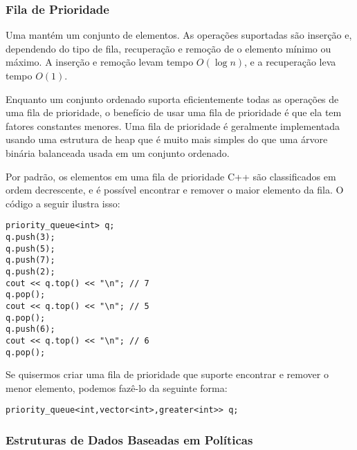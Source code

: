 \subsubsection{Fila de Prioridade}


Uma 
mantém um conjunto de elementos.
As operações suportadas são inserção e,
dependendo do tipo de fila,
recuperação e remoção de
o elemento mínimo ou máximo.
A inserção e remoção levam tempo $O(\log n)$,
e a recuperação leva tempo $O(1)$.

Enquanto um conjunto ordenado suporta eficientemente
todas as operações de uma fila de prioridade,
o benefício de usar uma fila de prioridade é
que ela tem fatores constantes menores.
Uma fila de prioridade é geralmente implementada usando
uma estrutura de heap que é muito mais simples do que uma
árvore binária balanceada usada em um conjunto ordenado.

\begin{samepage}
Por padrão, os elementos em uma
fila de prioridade C++ são classificados em ordem decrescente,
e é possível encontrar e remover o
maior elemento da fila.
O código a seguir ilustra isso:

\begin{lstlisting}
priority_queue<int> q;
q.push(3);
q.push(5);
q.push(7);
q.push(2);
cout << q.top() << "\n"; // 7
q.pop();
cout << q.top() << "\n"; // 5
q.pop();
q.push(6);
cout << q.top() << "\n"; // 6
q.pop();
\end{lstlisting}
\end{samepage}

Se quisermos criar uma fila de prioridade
que suporte encontrar e remover
o menor elemento,
podemos fazê-lo da seguinte forma:

\begin{lstlisting}
priority_queue<int,vector<int>,greater<int>> q;
\end{lstlisting}

\subsubsection{Estruturas de Dados Baseadas em Políticas}

